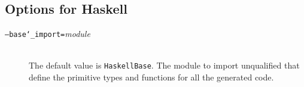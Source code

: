 \subsection{Options for Haskell}
\begin{description}
  \item[\normalfont\texttt{--base\char`\_import=}\textit{module}] \mbox{}\\
    The default value is \texttt{HaskellBase}. The module to import unqualified
    that define the primitive types and functions for all the generated
    code.
\end{description}%


